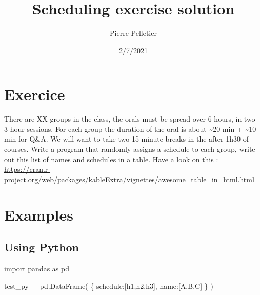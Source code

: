 \documentclass[
]{article}
\title{Scheduling exercise solution}
\author{Pierre Pelletier}
\date{2/7/2021}
\newenvironment{Shaded}{\begin{snugshade}}{\end{snugshade}}
\newcommand{\ImportTok}[1]{#1}
\newcommand{\NormalTok}[1]{#1}
\newcommand{\OperatorTok}[1]{\textcolor[rgb]{0.81,0.36,0.00}{\textbf{#1}}}
\newcommand{\StringTok}[1]{\textcolor[rgb]{0.31,0.60,0.02}{#1}}
\begin{document}
\maketitle

{
\setcounter{tocdepth}{2}
\tableofcontents
}
\newpage

\hypertarget{exercice}{%
\section{Exercice}\label{exercice}}

There are XX groups in the class, the orals must be spread over 6 hours,
in two 3-hour sessions. For each group the duration of the oral is about
\textasciitilde20 min + \textasciitilde10 min for Q\&A. We will want to
take two 15-minute breaks in the after 1h30 of courses. Write a program
that randomly assigns a schedule to each group, write out this list of
names and schedules in a table. Have a look on this :
\url{https://cran.r-project.org/web/packages/kableExtra/vignettes/awesome_table_in_html.html}

\hypertarget{examples}{%
\section{Examples}\label{examples}}

\hypertarget{using-python}{%
\subsection{Using Python}\label{using-python}}

\begin{Shaded}
\begin{Highlighting}[]

\ImportTok{import}\NormalTok{ pandas }\ImportTok{as}\NormalTok{ pd}

\NormalTok{test\_py }\OperatorTok{=}\NormalTok{ pd.DataFrame(}
\NormalTok{    \{}
     \StringTok{\textquotesingle{}schedule\textquotesingle{}}\NormalTok{:[}\StringTok{\textquotesingle{}h1\textquotesingle{}}\NormalTok{,}\StringTok{\textquotesingle{}h2\textquotesingle{}}\NormalTok{,}\StringTok{\textquotesingle{}h3\textquotesingle{}}\NormalTok{],}
     \StringTok{\textquotesingle{}name\textquotesingle{}}\NormalTok{:[}\StringTok{\textquotesingle{}A\textquotesingle{}}\NormalTok{,}\StringTok{\textquotesingle{}B\textquotesingle{}}\NormalTok{,}\StringTok{\textquotesingle{}C\textquotesingle{}}\NormalTok{]}
\NormalTok{     \}}
\NormalTok{    )}
\end{Highlighting}
\end{Shaded}
\end{document}
